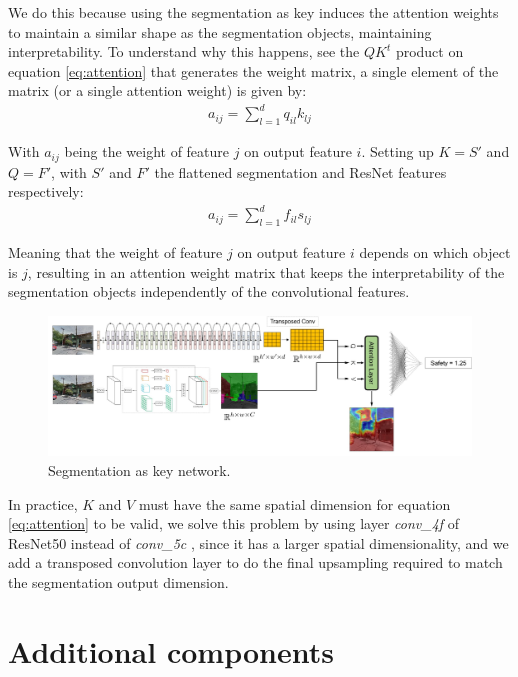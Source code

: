 We do this because using the segmentation as key induces the attention weights to maintain a similar shape as the segmentation objects,
maintaining interpretability. To understand why this happens, see the $QK^t$ product on equation \ref{eq:attention} that generates the
weight matrix, a single element of the matrix (or a single attention weight) is given by:
\begin{align}
	a_{ij} = \sum_{l=1}^d q_{il}k_{lj}
\end{align}

With $a_{ij}$ being the weight of feature $j$ on output feature $i$. Setting up $K=S'$  and $Q=F'$, with $S'$ and $F'$ the flattened segmentation and ResNet features
respectively:
\begin{align}
	a_{ij} = \sum_{l=1}^d f_{il}s_{lj}
\end{align}

Meaning that the weight of feature $j$ on output feature $i$ depends on which object is $j$, resulting in an attention weight matrix
that keeps the  interpretability of the segmentation objects independently of the convolutional features.

\begin{figure}[ht]
	\begin{center}
	\includegraphics[width=1\textwidth]{./figures/segattn.png}
	\caption[Segmentation as key network]{Segmentation as key network.}
	\label{fig:segrank_1}
	\end{center}
\end{figure}

In practice, $K$ and $V$ must have the same spatial dimension for equation \ref{eq:attention} to be valid,
we solve this problem by using layer \textit{conv\_4f} of ResNet50 instead of \textit{conv\_5c}  , since it has a
larger spatial dimensionality, and we add a transposed convolution layer \cite{noh_deconv} to do the final upsampling
required to match the segmentation output dimension.

\section{Additional components}
